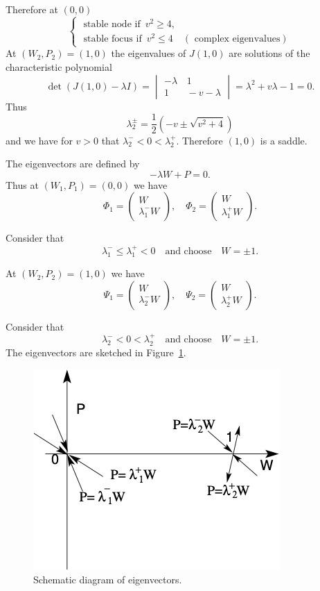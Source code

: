 \documentclass[
  letterpaper,
  DIV=11,
  numbers=noendperiod]{scrreprt}
\theoremstyle{plain}
\theoremstyle{definition}
\theoremstyle{plain}
\theoremstyle{remark}
\begin{document}
Therefore at \((0, 0)\) \[
\begin{cases} 
\text{ stable node if }\,   v^2 \geq 4, \\
\text{ stable focus if } \,  v^2 \leq 4 \quad (\text{ complex eigenvalues})
\end{cases}
\] At \((W_2, P_2)=(1,0)\) the eigenvalues of \(J(1,0)\) are solutions
of the characteristic polynomial \[
\det(J(1,0) - \lambda I) = \begin{vmatrix} -\lambda & \, 1 \\
1 & \, -v - \lambda
\end{vmatrix} = \lambda^2 + v \lambda - 1 = 0.
\] Thus \[
\lambda^{\pm}_2 = \frac 12 ( - v \pm \sqrt{ v^2 + 4})
\] and we have for \(v>0\) that \(\lambda_2^{-} <0 < \lambda_2^+\).
Therefore \((1,0)\) is a saddle.

The eigenvectors are defined by \[
- \lambda W + P = 0.
\] Thus at \((W_1, P_1)=(0,0)\) we have \[
\Phi_1 = \begin{pmatrix}
W\\
\lambda_1^- W
\end{pmatrix}, \quad  \Phi_2 = \begin{pmatrix}
W\\
\lambda_1^+ W
\end{pmatrix}. 
\]

Consider that \[
\lambda_1^- \leq \lambda_1^+ <0 \quad \textrm{and choose} \quad W = \pm 1.
\]

At \((W_2, P_2)=(1,0)\) we have \[
\Psi_1 = \begin{pmatrix}
W\\
\lambda_2^- W
\end{pmatrix}, \quad  \Psi_2 = \begin{pmatrix}
W\\
\lambda_2^+ W
\end{pmatrix}.
\]

Consider that \[
\lambda_2^- <0 < \lambda_2^+  \quad \textrm{and choose} \quad W = \pm 1.
\] The eigenvectors are sketched in Figure~\ref{fig-eigenvectors}.

\begin{figure}

{\centering \includegraphics{fig_4.png}

}

\caption{\label{fig-eigenvectors}Schematic diagram of eigenvectors.}

\end{figure}
\end{document}
